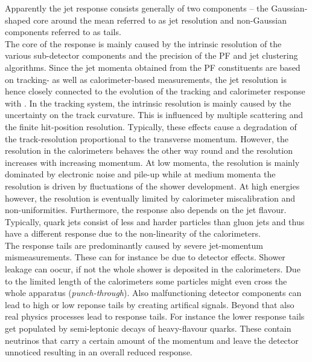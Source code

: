 Apparently the jet response consists generally of two components -- the Gaussian-shaped core around the mean referred to as jet resolution and non-Gaussian components referred to as tails. \\
The core of the response is mainly caused by the intrinsic resolution of the various sub-detector components and the precision of the PF and jet clustering algorithms. Since the jet momenta obtained from the PF constituents are based on tracking- as well as calorimeter-based measurements, the jet resolution is hence closely connected to the evolution of the tracking and calorimeter response with \pt. In the tracking system, the intrinsic resolution is mainly caused by the uncertainty on the track curvature. This is influenced by multiple scattering and the finite hit-position resolution. Typically, these effects cause a degradation of the track-\pt resolution proportional to the transverse momentum. However, the resolution in the calorimeters behaves the other way round and the resolution increases with increasing momentum. At low momenta, the resolution is mainly dominated by electronic noise and pile-up while at medium momenta the resolution is driven by fluctuations of the shower development. At high energies however, the resolution is eventually limited by calorimeter miscalibration and non-uniformities. Furthermore, the response also depends on the jet flavour. Typically, quark jets consist of less and harder particles than gluon jets and thus have a different response due to the non-linearity of the calorimeters.  \\
The response tails are predominantly caused by severe jet-momentum mismeasurements. These can for instance be due to detector effects. Shower leakage can oocur, if not the whole shower is deposited in the calorimeters. Due to the limited length of the calorimeters some particles might even cross the whole apparatus (\textit{punch-through}). Also malfunctioning detector components can lead to high or low reponse tails by creating artifical signals. Beyond that also real physics processes lead to response tails. For instance the lower response tails get populated by semi-leptonic decays of heavy-flavour quarks. These contain neutrinos that carry a certain amount of the momentum and leave the detector unnoticed resulting in an overall reduced response. 

